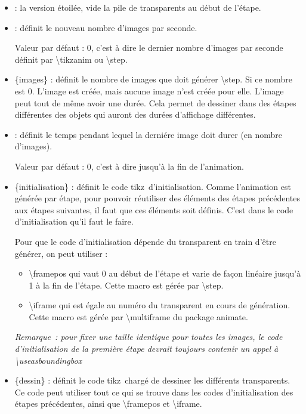 \documentclass[a4paper,12pt]{article}
\newcommand\Tikz{{\ttfamily tikz}}
\newcommand\Animate{{\ttfamily animate}}
\begin{document}
	\begin{itemize}
		\item {\ttfamily *} : la version étoilée, vide la pile de transparents au début de l'étape.
		\item {\ttfamily[rafraîchissement]} : définit le nouveau nombre d'images par seconde.
		
		Valeur par défaut : 0, c'est à dire le dernier nombre d'images par seconde définit par {\ttfamily\textbackslash tikzanim} ou {\ttfamily\textbackslash step}.
		\item {\ttfamily\{images\}} : définit le nombre de images que doit générer {\ttfamily\textbackslash step}. Si ce nombre est 0. L'image est créée, mais aucune image n'est créée
		pour elle. L'image peut tout de même avoir une durée. Cela permet de dessiner dans des étapes différentes des objets qui auront des durées d'affichage différentes.
		
		\item {\ttfamily[durée]} : définit le temps pendant lequel la derniére image doit durer (en nombre d'images).
		
		Valeur par défaut : 0, c'est à dire jusqu'à la fin de l'animation.
		\item {\ttfamily\{initialisation\}} : définit le code \Tikz\ d'initialisation. Comme l'animation est générée par étape, pour pouvoir réutiliser des éléments 
		des étapes précédentes aux étapes suivantes, il faut que ces éléments soit définis. C'est dans le code d'initialisation qu'il faut le faire.
		
		Pour que le code d'initialisation dépende du transparent en train d'être générer, on peut utiliser :
		\begin{itemize}
			\item {\ttfamily\textbackslash framepos} qui vaut 0 au  début de l'étape et varie de façon linéaire jusqu'à 1 à la fin de l'étape. Cette macro est gérée par {\ttfamily\textbackslash step}.
			\item {\ttfamily\textbackslash iframe} qui est égale au numéro du transparent en cours de génération. Cette macro est gérée par {\ttfamily\textbackslash multiframe} du package \Animate.
		\end{itemize}
		
		\emph{Remarque~: pour fixer une taille identique pour toutes les images, le code d'initialisation de la première étape devrait toujours contenir un appel à 
		{\ttfamily\textbackslash useasboundingbox} }

		\item {\ttfamily\{dessin\}} : définit le code \Tikz\ chargé de dessiner les différents transparents. Ce code peut utiliser tout ce qui se trouve dans
		les codes d'initialisation des étapes précédentes, ainsi que {\ttfamily\textbackslash framepos} et {\ttfamily\textbackslash iframe}.
	\end{itemize}
	
\end{document}
